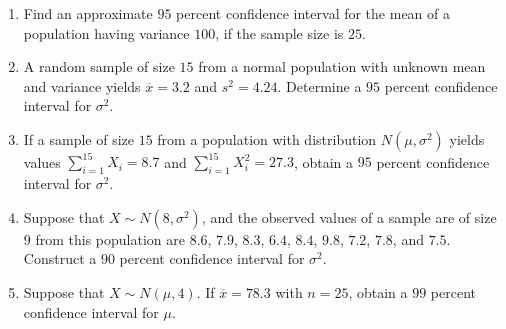 \documentclass[svgnames]{amsart}
\begin{document}
\begin{enumerate}[leftmargin=*, itemsep=2mm]
\item Find an approximate $95$ percent confidence interval for the mean of a population having variance $100$, if the sample size is $25$.

\item A random sample of size $15$ from a normal population with unknown mean and variance yields $\overline x = 3.2$ and $s^2 = 4.24$. Determine a $95$ percent confidence interval for $\sigma^2$.

\item If a sample of size $15$ from a population with distribution $N(\mu, \sigma^2)$ yields values $\sum_{i=1}^{15} X_i = 8.7$ and $\sum_{i = 1}^{15} X_i^2 = 27.3$, obtain a $95$ percent confidence interval for $\sigma^2$.

\item Suppose that $X \sim N(8, \sigma^2)$, and the observed values of a sample are of size $9$ from this population are $8.6$, $7.9$, $8.3$, $6.4$, $8.4$, $9.8$, $7.2$, $7.8$, and $7.5$. Construct a $90$ percent confidence interval for $\sigma^2$.

\item Suppose that $X \sim N(\mu, 4)$. If $\overline x = 78.3$ with $n = 25$, obtain a $99$ percent confidence interval for $\mu$.

\end{enumerate}
\end{document}
